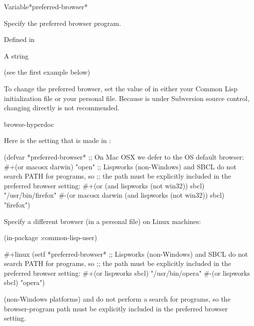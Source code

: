 \documentclass[10pt,twoside,english,pdftex]{article}
\begin{document}
\begin{functiondoc}{Variable}{*preferred-browser*}{}%

\fnsyntax

\fnpurpose Specify the preferred browser program.

\fnpackage {}

\fnmodule Defined in 

\fnvaluetype A string

\fninitialvalue (see the first example below)

\fndescription To change the preferred browser, set the value of
 in either your Common Lisp initialization
file or your personal  file.  Because
 is under Subversion source control, changing
 directly is not recommended.

\begin{alsos}{browse-hyperdoc}
\end{alsos}

\fnexamples
Here is the setting that is made in :
\begin{example}
  (defvar *preferred-browser* 
      ;; On Mac OSX we defer to the OS default browser:
      #+(or macosx darwin)
      "open"
      ;; Lispworks (non-Windows) and SBCL do not search PATH for programs, so
      ;; the path must be explicitly included in the preferred browser setting:
      #+(or (and lispworks (not win32)) sbcl) "/usr/bin/firefox"
      #-(or macosx darwin (and lispworks (not win32)) sbcl) "firefox")
\end{example}

Specify a different browser (in a personal 
file) on Linux machines:
\begin{example}
  (in-package :common-lisp-user)

  #+linux
  (setf *preferred-browser* 
    ;; Lispworks (non-Windows) and SBCL do not search PATH for programs, so
    ;; the path must be explicitly included in the preferred browser setting:
     #+(or lispworks sbcl) "/usr/bin/opera"
     #-(or lispworks sbcl) "opera")
\end{example}

\fnnotes {} (non-Windows
platforms) and  do not perform a
 search for programs, so the browser-program path must be explicitly
included in the preferred browser setting.

\end{functiondoc}
\end{document}
